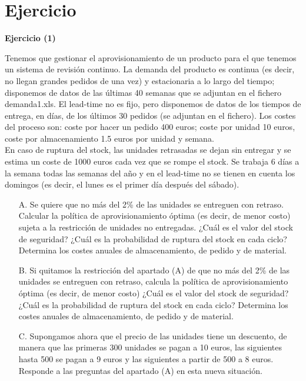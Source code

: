\documentclass[a4paper,12pt]{article}
\newenvironment{exercise}[1]%
{%
  \par\vspace{\baselineskip}\noindent
  \textbf{Ejercicio (#1)}\begin{itshape}%
  \par\vspace{\baselineskip}\noindent\ignorespaces
}%
{%
  \end{itshape}\ignorespacesafterend
}
\begin{document}
\section{Ejercicio}
\begin{exercise}{1}
Tenemos que gestionar el aprovisionamiento de un producto para el que tenemos un sistema de revisión continuo. La demanda del producto es continua (es decir, no llegan grandes pedidos de una vez) y estacionaria a lo largo del tiempo; disponemos de datos de las últimas 40 semanas que se adjuntan en el fichero demanda1.xls. El lead-time no es fijo, pero disponemos de datos de los tiempos de entrega, en días, de los últimos 30 pedidos (se adjuntan en el fichero). Los costes del proceso son: coste por hacer un pedido 400 euros; coste por unidad 10 euros, coste por almacenamiento 1.5 euros por unidad y semana.\\

En caso de ruptura del stock, las unidades retrasadas se dejan sin entregar y se estima un coste de 1000 euros cada vez que se rompe el stock. Se trabaja 6 días a la semana todas las semanas del año y en el lead-time no se tienen en cuenta los domingos (es decir, el lunes es el primer día después del sábado).\\

\begin{itemize}

\item[A.] Se quiere que no más del 2\% de las unidades se entreguen con retraso. Calcular la política de aprovisionamiento óptima (es decir, de menor costo) sujeta a la restricción de unidades no entregadas. ¿Cuál es el valor del stock de seguridad? ¿Cuál es la probabilidad de ruptura del stock en cada ciclo? Determina los costes anuales de almacenamiento, de pedido y de material. 

\item[B.] Si quitamos la restricción del apartado (A) de que no más del 2\% de las unidades se entreguen con retraso, calcula la política de aprovisionamiento óptima (es decir, de menor costo) ¿Cuál es el valor del stock de seguridad? ¿Cuál es la probabilidad de ruptura del stock en cada ciclo? Determina los costes anuales de almacenamiento, de pedido y de material.

\item[C.] Supongamos ahora que el precio de las unidades tiene un descuento, de manera que las primeras 300 unidades se pagan a 10 euros, las siguientes hasta 500 se pagan a 9 euros y las siguientes a partir de 500 a 8 euros. Responde a las preguntas del apartado (A) en esta nueva situación.
\end{itemize}

\end{exercise}
\end{document}
